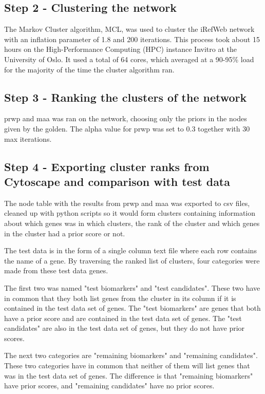 \subsection{Step 2 - Clustering the network}
The Markov Cluster algorithm, MCL, was used to cluster the iRefWeb network with
an inflation parameter of 1.8 and 200 iterations. This process took about 15
hours on the High-Performance Computing (HPC) instance Invitro at the University
of Oslo. It used a total of 64 cores, which averaged at a 90-95\% load for the
majority of the time the cluster algorithm ran.

\subsection{Step 3 - Ranking the clusters of the network}
\gls{prwp} and \gls{maa} was ran on the network, choosing only the priors in the
nodes given by the \gls{golden}. The alpha value for \gls{prwp} was set to 0.3
together with 30 max iterations.

\subsection{Step 4 - Exporting cluster ranks from Cytoscape and comparison with test data}
The node table with the results from \gls{prwp} and \gls{maa} was exported to
csv files, cleaned up with python scripts so it would form clusters containing
information about which genes was in which clusters, the rank of the cluster and
which genes in the cluster had a prior score or not.

The test data is in the form of a single column text file where each row
contains the name of a gene. By traversing the ranked list of clusters, four
categories were made from these test data genes. 

The first two was named "test biomarkers" and "test candidates". These two have
in common that they both list genes from the cluster in its column if it is
contained in the test data set of genes. The "test biomarkers" are genes that
both have a prior score and are contained in the test data set of genes. The
"test candidates" are also in the test data set of genes, but they do not have
prior scores.

The next two categories are "remaining biomarkers" and "remaining candidates".
These two categories have in common that neither of them will list genes that
was in the test data set of genes. The difference is that "remaining biomarkers"
have prior scores, and "remaining candidates" have no prior scores.

